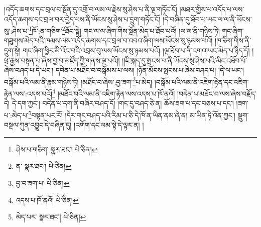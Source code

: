 །འདོད་ཆགས་དང་བྲལ་བ་སྔོན་དུ་འགྲོ་བ་ལམ་ལ་རྗེས་སུ་ཤེས་པ་ནི་ལྔ་གཏོང་ངོ། །མཐར་གྱིས་པ་འདོད་པ་ལས་འདོད་ཆགས་དང་བྲལ་བར་བྱེད་པས་ནི་ཡོངས་སུ་ཤེས་པ་དྲུག་གཏོང་ངོ། །དེ་བཞིན་དུ་ཐོབ་པ་ཡང་ལ་ལ་ནི་ཡོངས་སུ་:ཤེས་པ་\footnote{ཤེས་པ་གཅིག་  སྣར་ཐང་།  པེ་ཅིན། }ཁོ་:ན་གཅིག་\footnote{ན་  སྣར་ཐང་།  པེ་ཅིན། }ཐོབ་སྟེ། གང་ལ་ལ་ཞིག་གིས་སྔོན་མེད་པ་ཐོབ་པའོ། །ལ་ལ་ནི་གཉིས་ཏེ། གང་ཞིག་གཟུགས་མེད་པའི་ཁམས་ལས་འདོད་ཆགས་དང་བྲལ་བ་འབའ་ཞིག་ལས་ཡོངས་སུ་ཉམས་པའོ། །ཁ་ཅིག་གིས་ནི་དྲུག་སྟེ། གང་ཞིག་ཕྱིར་མི་འོང་བའི་འབྲས་བུ་ལས་ཡོངས་སུ་ཉམས་པའོ། །ལྔ་ཐོབ་པ་ནི་འགའ་ཡང་མེད་པ་ཉིད་དོ། །ཕྲ་རྒྱས་བསྟན་པ་ཞེས་བྱ་བ་མཛོད་ཀྱི་གནས་ལྔ་པའོ།། །།ཇི་སྐད་དུ་སྤངས་པ་ནི་ཡོངས་སུ་ཤེས་པའི་མིང་འཐོབ་པོ་ཞེས་བཤད་པ་དེ་ཡང་། དབེན་པ་མཐོང་བ་བསྒོམས་པ་ལས། །ཉོན་མོངས་སྤངས་པ་ཞེས་བཤད་པ། །དེ་ལ་ཡང་། བསྒོམ་པའི་ལམ་ནི་རྣམ་གཉིས་ཏེ། །མཐོང་བ་ཞེས་:བྱ་ཟག་\footnote{བྱ་བ་ཟག་པ་  པེ་ཅིན། }པ་མེད། །བསྒོམ་པའི་ལམ་ནི་འཇིག་རྟེན་དང་འཇིག་རྟེན་ལས་:འདས་པའོ།\footnote{འདས་པ་ཁོ་ནའོ།  པེ་ཅིན། } །མཐོང་བའི་ལམ་ནི་འཇིག་རྟེན་ལས་འདས་པ་ཁོ་ནའོ། །བདེན་པ་མཐོང་བ་ལས་ཞེས་བརྗོད་དེ། དེ་དག་ཀྱང་། བདེན་པ་དག་ནི་བཞིར་བཤད་དོ། །གང་དུ་བཤད་ཅེ་ན། ཆོས་ཟག་པ་དང་བཅས་པ་དང་། །ཟག་པ་:མེད་པ་\footnote{མེད་པར་  སྣར་ཐང་།  པེ་ཅིན། }བསྟན་པར་རོ། །དེར་གང་བཤད་པའི་རིམ་པ་ཅི་དེ་ཁོ་ན་ཡིན་ནམ་ཞེ་ན། མ་ཡིན་ཏེ་འོན་ཀྱང་། སྡུག་བསྔལ་ཀུན་འབྱུང་དེ་བཞིན་དུ། །འགོག་དང་ལམ་སྟེ་དེ་ལྟར་ན། །
